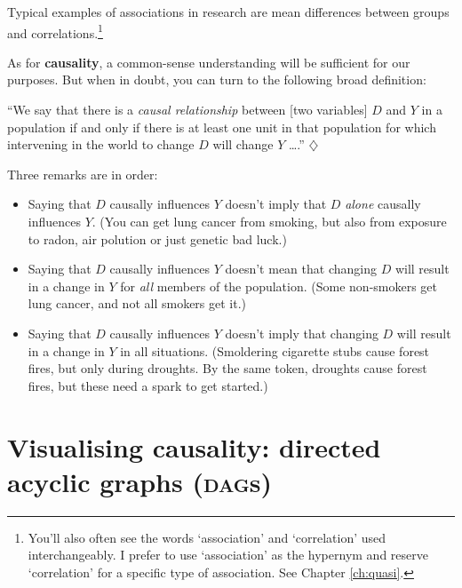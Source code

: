 \documentclass[a4paper]{tufte-book}\usepackage[]{graphicx}\usepackage[]{xcolor}
\newcommand{\term}[1]{\textbf{#1}}
\newcommand*{\parend}[1][$\diamondsuit$]{%
\leavevmode\unskip\penalty9999 \hbox{}\nobreak\hfill
    \quad\hbox{#1}%
}
\begin{document}
\medskip

Typical examples of associations in research are mean differences between
groups and correlations.\footnote{You'll also often see the words `association' and
`correlation' used interchangeably. I prefer to use `association' as the hypernym
and reserve `correlation' for a specific type of association. See Chapter \ref{ch:quasi}.}

As for \term{causality},
a common-sense understanding will be sufficient for our purposes.
But when in doubt, you can turn to the following broad definition:

``We say that there is a \emph{causal relationship} between
[two variables] $D$ and $Y$ in a population if and only if there is at least
one unit in that population for which intervening in the world
to change $D$ will change $Y$ \dots.'' \citep[p. 3]{Keele2019}
\parend
\medskip

Three remarks are in order:

\begin{itemize}
  \item Saying that $D$ causally influences $Y$ doesn't imply
  that $D$ \emph{alone} causally influences $Y$.
  (You can get lung cancer from smoking, but also from exposure to
  radon, air polution or just genetic bad luck.)

  \item Saying that $D$ causally influences $Y$ doesn't mean
  that changing $D$ will result in a change in $Y$ for \emph{all} members
  of the population.
  (Some non-smokers get lung cancer, and not all smokers get it.)

  \item Saying that $D$ causally influences $Y$ doesn't imply
  that changing $D$ will result in a change in $Y$ in all situations.
  (Smoldering cigarette stubs cause forest fires, but only during droughts.
  By the same token, droughts cause forest fires, but these need a spark to get started.)
\end{itemize}

\section{Visualising causality: directed acyclic graphs (\textsc{dag}s)}
\end{document}
